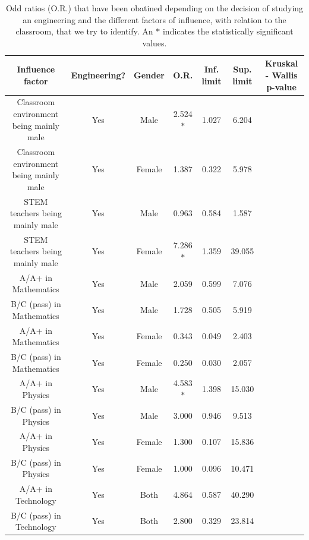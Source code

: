 \documentclass[journal,transmag]{IEEEtran}
\begin{document}
\begin{table}
	\caption[Odd ratios for every influence factor.]{Odd ratios (O.R.) that have been obatined depending on the decision of studying an engineering and the different factors of influence, with relation to the classroom, that we try to identify. An \textbf{$*$} indicates the statistically significant values.}
	\label{tab:oddratios}
	
	\begin{center}
		\begin{tabular}{|c|c|c|c|c|c|c|}
		\hline
		Influence factor & Engineering? & Gender & O.R. & Inf. limit & Sup. limit & Kruskal - Wallis p-value \\ \hline
		Classroom environment being mainly male & Yes & Male & 2.524$*$ & 1.027 & 6.204 & \multirow{2}{*}{} \\ \cline{1-6}
		Classroom environment being mainly male & Yes & Female & 1.387 & 0.322 & 5.978 & \\ \hline
		STEM teachers being mainly male & Yes & Male & 0.963 & 0.584 & 1.587 & \multirow{2}{*}{} \\ \cline{1-6}
		STEM teachers being mainly male & Yes & Female & 7.286$*$ & 1.359 & 39.055 & \\ \hline
		A/A+ in Mathematics & Yes & Male & 2.059 & 0.599 & 7.076 & \multirow{2}{*}{} \\ \cline{1-6}
		B/C (pass) in Mathematics & Yes & Male & 1.728 & 0.505 & 5.919 & \\ \hline
		A/A+ in Mathematics & Yes & Female & 0.343 & 0.049 & 2.403 & \multirow{2}{*}{} \\ \cline{1-6}
		B/C (pass) in Mathematics & Yes & Female & 0.250 & 0.030 & 2.057 & \\ \hline
		A/A+ in Physics & Yes & Male & 4.583$*$ & 1.398 & 15.030 & \multirow{2}{*}{} \\ \cline{1-6}
		B/C (pass) in Physics & Yes & Male & 3.000 & 0.946 & 9.513 & \\ \hline
		A/A+ in Physics & Yes & Female & 1.300 & 0.107 & 15.836 & \multirow{2}{*}{} \\ \cline{1-6}
		B/C (pass) in Physics & Yes & Female & 1.000 & 0.096 & 10.471 & \\ \hline
		A/A+ in Technology & Yes & Both & 4.864 & 0.587 & 40.290 & \multirow{2}{*}{} \\ \cline{1-6}
		B/C (pass) in Technology & Yes & Both & 2.800 & 0.329 & 23.814 & \\ \hline
		\end{tabular}
	\end{center}
\end{table}
\end{document}
